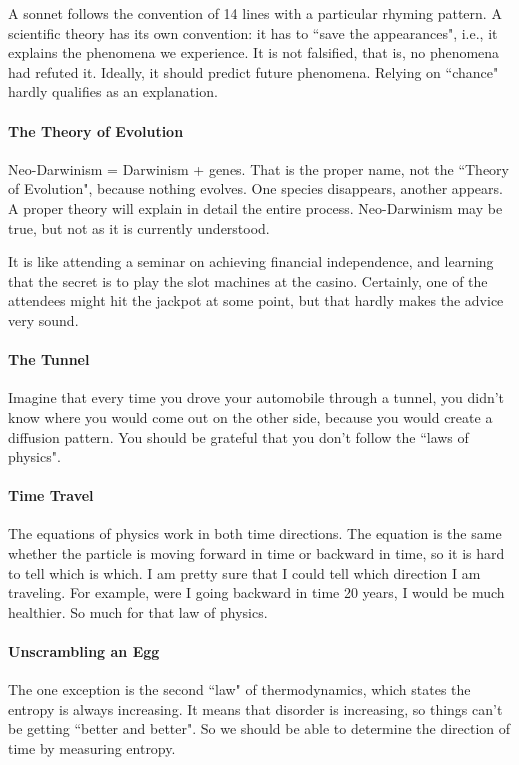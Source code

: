 A sonnet follows the convention of 14 lines with a particular rhyming pattern. A scientific theory has its own convention: it has to ``save the appearances", i.e., it explains the phenomena we experience. It is not falsified, that is, no phenomena had refuted it. Ideally, it should predict future phenomena. Relying on ``chance" hardly qualifies as an explanation.

\paragraph{The Theory of Evolution}
Neo-Darwinism = Darwinism + genes. That is the proper name, not the ``Theory of Evolution", because nothing evolves. One species disappears, another appears. A proper theory will explain in detail the entire process. Neo-Darwinism may be true, but not as it is currently understood.

It is like attending a seminar on achieving financial independence, and learning that the secret is to play the slot machines at the casino. Certainly, one of the attendees might hit the jackpot at some point, but that hardly makes the advice very sound.

\paragraph{The Tunnel}
Imagine that every time you drove your automobile through a tunnel, you didn't know where you would
come out on the other side, because you would create a diffusion pattern. You should be grateful that you don't follow the ``laws of physics".

\paragraph{Time Travel}
The equations of physics work in both time directions. The equation is the same whether the particle is moving forward in time or backward in time, so it is hard to tell which is which. I am pretty sure that I could tell which direction I am traveling. For example, were I going backward in time 20 years, I would be much healthier. So much for that law of physics.

\paragraph{Unscrambling an Egg}

The one exception is the second ``law" of thermodynamics, which states the entropy is always increasing. It means that disorder is increasing, so things can't be getting ``better and better". So we should be able to determine the direction of time by measuring entropy.

